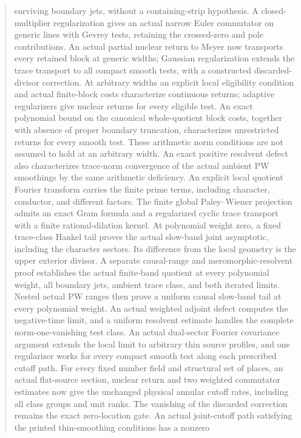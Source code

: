 \documentclass[11pt,a4paper]{article}
\begin{document}
\begin{abstract}
surviving boundary jets, without a containing-strip hypothesis.
A closed-multiplier regularization gives an actual narrow
Euler commutator on generic lines with Gevrey tests, retaining
the crossed-zero and pole contributions. An actual partial nuclear
return to Meyer now transports every retained block at generic
widths; Gaussian regularization extends the trace transport to
all compact smooth tests, with a constructed discarded-divisor
correction. At arbitrary widths an explicit local eligibility condition
and actual finite-block costs characterize continuous returns; adaptive
regularizers give nuclear returns for every eligible test. An exact
polynomial bound on the canonical whole-quotient block costs,
together with absence of proper boundary truncation, characterizes
unrestricted returns for every smooth test. These arithmetic norm
conditions are not assumed to hold at an arbitrary width. An exact
positive resolvent defect also characterizes trace-norm convergence
of the actual ambient PW smoothings by the same arithmetic deficiency. An explicit local quotient Fourier transform carries
the finite prime terms, including character, conductor, and
different factors. The finite global Paley--Wiener projection
admits an exact Gram formula and a regularized cyclic trace
transport with a finite rational-dilation kernel. At polynomial
weight zero, a fixed trace-class Hankel tail proves the actual
slow-band joint asymptotic, including the character sectors. Its
difference from the local geometry is the upper exterior divisor.
A separate causal-range and meromorphic-resolvent proof establishes
the actual finite-band quotient at every polynomial weight, all
boundary jets, ambient trace class, and both iterated limits.
Nested actual PW ranges then prove a uniform causal slow-band
tail at every polynomial weight. An actual weighted adjoint defect
computes the negative-time limit, and a uniform resolvent estimate
handles the complete norm-one-vanishing test class. An actual dual-sector Fourier covariance argument extends the local
limit to arbitrary thin source profiles, and one regularizer works
for every compact smooth test along each prescribed cutoff path.
For every fixed number field and structural set of places, an
actual flat-source section, nuclear return and two weighted
commutator estimates now give the unchanged physical annular
cutoff rates, including all class groups and unit ranks.
The vanishing of the discarded correction remains the exact zero-location gate. An actual joint-cutoff path
satisfying the printed thin-smoothing conditions has a nonzero

\end{abstract}
\end{document}
